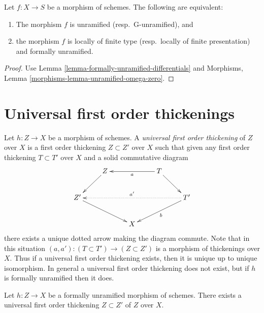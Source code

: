 \begin{lemma}
\label{lemma-unramified-formally-unramified}
Let $f : X \to S$ be a morphism of schemes.
The following are equivalent:
\begin{enumerate}
\item The morphism $f$ is unramified (resp.\ G-unramified), and
\item the morphism $f$ is locally of finite type (resp.\ locally of finite
presentation) and formally unramified.
\end{enumerate}
\end{lemma}

\begin{proof}
Use Lemma \ref{lemma-formally-unramified-differentials} and
Morphisms, Lemma \ref{morphisms-lemma-unramified-omega-zero}.
\end{proof}









\section{Universal first order thickenings}
\label{section-universal-thickening}

\noindent
Let $h : Z \to X$ be a morphism of schemes. A {\it universal first order
thickening} of $Z$ over $X$ is a first order thickening $Z \subset Z'$
over $X$ such that given any first order thickening $T \subset T'$
over $X$ and a solid commutative diagram
$$
\xymatrix{
& Z \ar[ld] & & T \ar[rd] \ar[ll]^a \\
Z' \ar[rrd] & & & & T' \ar@{..>}[llll]_{a'} \ar[lld]^b \\
 & & X
}
$$
there exists a unique dotted arrow making the diagram commute.
Note that in this situation $(a, a') : (T \subset T') \to (Z \subset Z')$
is a morphism of thickenings over $X$. Thus if a universal first order
thickening exists, then it is unique up to unique isomorphism.
In general a universal first order thickening
does not exist, but if $h$ is formally unramified then it does.

\begin{lemma}
\label{lemma-universal-thickening}
Let $h : Z \to X$ be a formally unramified morphism of schemes.
There exists a universal first order thickening $Z \subset Z'$ of
$Z$ over $X$.
\end{lemma}

